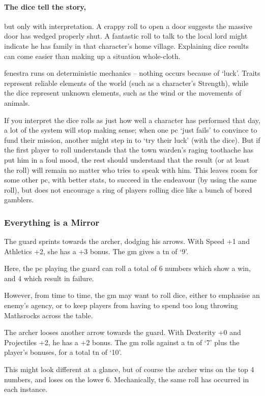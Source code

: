 \begin{multicols}{2}
\paragraph{The dice tell the story,} but only with interpretation.
A crappy roll to open a door suggests the massive door has wedged properly shut.
A fantastic roll to talk to the local lord might indicate he has family in that character's home \gls{village}.
Explaining dice results can come easier than making up a situation whole-cloth.

\Gls{fenestra} runs on deterministic mechanics -- nothing occurs because of `luck'.
Traits represent reliable elements of the world (such as a character's Strength), while the dice represent unknown elements, such as the wind or the movements of animals.

If you interpret the dice rolls as just how well a character has performed that day, a lot of the system will stop making sense; when one \gls{pc} `just fails' to convince  to fund their mission, another might step in to `try their luck' (with the dice).
But if the first player to roll understands that the town \gls{warden}'s raging toothache has put him in a foul mood, the rest should understand that the result (or at least the roll) will remain no matter who tries to speak with him.
This leaves room for some other \gls{pc}, with better stats, to succeed in the endeavour (by using the same roll), but does not encourage a ring of players rolling dice like a bunch of bored gamblers.

\subsubsection{Everything is a Mirror}

\begin{exampletext}
  The guard sprints towards the archer, dodging his arrows.
  With Speed +1 and Athletics +2, she has a +3 bonus.
  The \gls{gm} gives a \gls{tn} of `9'.
\end{exampletext}

\noindent
Here, the \gls{pc} playing the guard can roll a total of 6 numbers which show a win, and 4 which result in failure.

However, from time to time, the \gls{gm} may want to roll dice, either to emphasise an enemy's agency, or to keep players from having to spend too long throwing Mathsrocks across the table.

\begin{exampletext}
  The archer looses another arrow towards the guard.
  With Dexterity +0 and Projectiles +2, he has a +2 bonus.
  The \gls{gm} rolls against a \gls{tn} of `7' plus the player's bonuses, for a total \gls{tn} of `10'.
\end{exampletext}

\noindent
This might look different at a glance, but of course the archer wins on the top 4 numbers, and loses on the lower 6.
Mechanically, the same roll has occurred in each instance.

\end{multicols}

